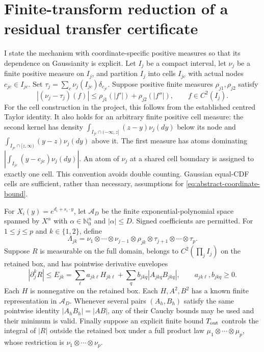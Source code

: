 \section{Finite-transform reduction of a residual transfer certificate}
\label{supp:abstract-transfer-reduction}

I state the mechanism with coordinate-specific positive measures so that
its dependence on Gaussianity is explicit. Let $I_j$ be a compact
interval, let $\nu_j$ be a finite positive measure on $I_j$, and partition
$I_j$ into cells $I_{jc}$ with actual nodes $c_{jc}\in I_{jc}$. Set
$\tau_j=\sum_c\nu_j(I_{jc})\delta_{c_{jc}}$. Suppose positive finite
measures $\rho_{j1},\rho_{j2}$ satisfy
\begin{equation}
 |(\nu_j-\tau_j)(f)|\leq
 \rho_{j1}(|f'|)+\rho_{j2}(|f''|),\qquad f\in C^2(I_j).
 \label{eq:abstract-coordinate-bound}
\end{equation}
For the cell construction in the project, this follows from the
established centred Taylor identity. It also holds for an arbitrary
finite positive cell measure: the second kernel has density
$\int_{I_{jc}\cap(-\infty,z]}(z-y)\nu_j(dy)$ below its node and
$\int_{I_{jc}\cap[z,\infty)}(y-z)\nu_j(dy)$ above it. The first
measure has atoms dominating
$|\int_{I_{jc}}(y-c_{jc})\nu_j(dy)|$. An atom of $\nu_j$ at a shared
cell boundary is assigned to exactly one cell. This convention avoids
double counting. Gaussian equal-CDF cells are sufficient, rather than
necessary, assumptions for \eqref{eq:abstract-coordinate-bound}.

For $X_i(y)=e^{d_i+s_i\cdot y}$, let $\mathcal A_D$ be the finite
exponential-polynomial space spanned by $X^\alpha$ with
$\alpha\in\mathbb N_0^n$ and
$|\alpha|\leq D$. Signed coefficients are permitted. For
$1\leq j\leq p$ and $k\in\{1,2\}$, define
\[
 \Lambda_{jk}=\nu_1\otimes\cdots\otimes\nu_{j-1}
       \otimes\rho_{jk}\otimes\tau_{j+1}\otimes\cdots\otimes\tau_p.
\]
Suppose $R$ is measurable on the full domain, belongs to
$C^2(\prod_jI_j)$ on the retained box, and has pointwise derivative
envelopes
\[
 |\partial_j^kR|\leq E_{jk}
 =\sum_\ell a_{jk\ell}H_{jk\ell}
   +\sum_q b_{jkq}|A_{jkq}B_{jkq}|,
 \qquad a_{jk\ell},b_{jkq}\geq0.
\]
Each $H$ is nonnegative on the retained box. Each $H,A^2,B^2$ has a
known finite representation in $\mathcal A_D$. Whenever several pairs
$(A_h,B_h)$ satisfy the same pointwise identity
$|A_hB_h|=|AB|$, any of their Cauchy bounds may be used and their
minimum is valid. Finally suppose an explicit finite bound $T_{\rm out}$
controls the integral of $|R|$ outside the retained box under a full
product law $\mu_1\otimes\cdots\otimes\mu_p$, whose restriction is
$\nu_1\otimes\cdots\otimes\nu_p$.

